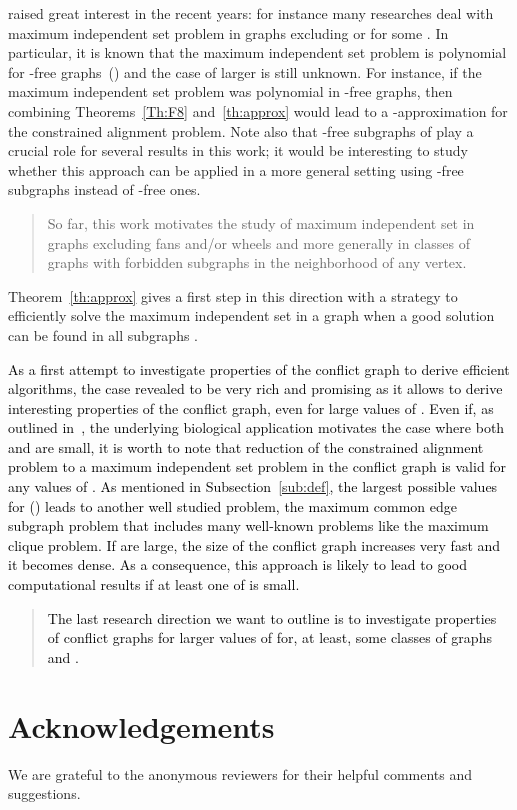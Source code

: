 \documentclass[final]{dmtcs-episciences}
\newcommand\mar[1]{\textcolor{black}{#1}}
\begin{document}
raised great interest in the recent years: for instance many researches deal with maximum independent set problem in graphs excluding  or  for some . In particular, it is known that the maximum independent set  problem is  polynomial for -free graphs~(\citet{ISP5}) and the case of larger  is still unknown. For instance, if the maximum independent set problem was polynomial in -free graphs, then combining Theorems~\ref{Th:F8} and~\ref{th:approx} would lead to a -approximation for the constrained alignment problem. Note also that -free subgraphs of  play a crucial role for several results in this work; it would be interesting to study whether this approach can be applied in a more general setting using -free subgraphs instead of -free ones. 
\begin{quote}
So far, this work motivates the study of maximum independent set in graphs excluding fans and/or wheels
and more generally in classes of graphs with forbidden subgraphs in the neighborhood of any vertex.
\end{quote}
Theorem~\ref{th:approx} gives a first step in this direction with a strategy to efficiently solve the maximum independent set in a graph  when a good solution can be found in all subgraphs . 

\mar{As a first attempt to investigate properties of the conflict graph to derive efficient algorithms, the case  revealed to be very rich and promising as it allows to derive interesting properties of the conflict graph, even for large values of . Even if, as outlined in~\cite{Fagnot2008}, the underlying biological application motivates the case where both  and  are small, it is worth to note that reduction of the constrained alignment problem to a maximum independent set problem in the conflict graph is valid for any values of .   As mentioned in Subsection~\ref{sub:def}, the largest possible values for  ()  leads to   another well studied problem, the maximum common edge subgraph problem that includes many well-known problems like the maximum clique problem. If  are large, the size of the conflict graph increases very fast and it becomes dense. As a consequence,  this approach is likely to lead to good computational results if at least one of  is small.} 

\begin{quote}
    \mar{The last research direction we want to outline is to investigate properties of conflict graphs for larger values of  for, at least, some classes of graphs  and .}
\end{quote}

\section*{Acknowledgements}
We are grateful to the anonymous reviewers for their helpful comments and suggestions.


	   
\end{document}
